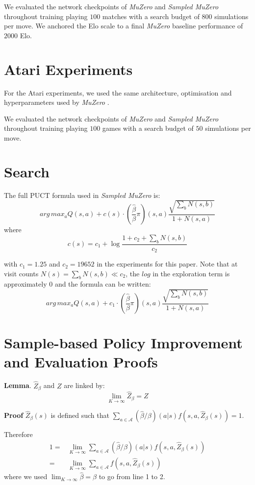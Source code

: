\documentclass{article}
\newcommand{\muzero}{\emph{MuZero}}
\newcommand{\smuzero}{\emph{Sampled MuZero}}
\newcommand{\sample}{\beta}
\begin{document}
We evaluated the network checkpoints of \muzero{} and \smuzero{} throughout training playing $100$ matches with a search budget of $800$ simulations per move. We anchored the Elo scale to a final \muzero{} baseline performance of $2000$ Elo.

\section{Atari Experiments}
For the Atari experiments, we used the same architecture, optimisation and hyperparameters used by \muzero{} \cite{muzero}.

We evaluated the network checkpoints of \muzero{} and \smuzero{} throughout training playing $100$ games with a search budget of $50$ simulations per move.

\section{Search}
\label{search}

The full PUCT formula used in \smuzero{} is:
$$arg\,max_a Q(s,a)+c(s) \cdot (\frac{\hat{\sample}}{\sample}\pi)(s, a)\frac{\sqrt{\sum_b N(s,b)}}{1+N(s,a)}$$
where
$$
c(s) = c_1 + \log\frac{1+c_2+\sum_b N(s,b)}{c_2}
$$

with $c_1 = 1.25$ and $c_2 = 19652$ in the experiments for this paper. Note that at visit counts $N(s)=\sum_b N(s,b) \ll c_2$, the $log$ in the exploration term is approximately $0$ and the formula can be written:
$$arg\,max_a Q(s,a) + c_1 \cdot (\frac{\hat{\sample}}{\sample}\pi)(s, a)\frac{\sqrt{\sum_b N(s,b)}}{1+N(s,a)}$$

\section{Sample-based Policy Improvement and Evaluation Proofs}
\label{proofs}
\textbf{Lemma}. $\hat{Z}_\sample$ and $Z$ are linked by:
$$\lim_{K\to\infty} \hat{Z}_\sample = Z$$

\textbf{Proof}
$\hat{Z}_\sample(s)$ is defined such that $\sum_{a\in\mathcal{A}}(\hat{\sample}/\sample)(a|s) f(s, a, \hat{Z}_\sample(s))=1$.

Therefore
\begin{equation*}
\begin{split}
1 =& \lim_{K\to\infty} \sum_{a\in\mathcal{A}} (\hat{\sample}/\sample)(a|s)  f(s, a, \hat{Z}_\sample(s)) \\
=& \lim_{K\to\infty} \sum_{a\in\mathcal{A}} f(s, a, \hat{Z}_\sample(s))
\end{split}
\end{equation*}
where we used $\lim_{K\to\infty} \hat{\sample} = \sample$ to go from line 1 to 2.
\end{document}
